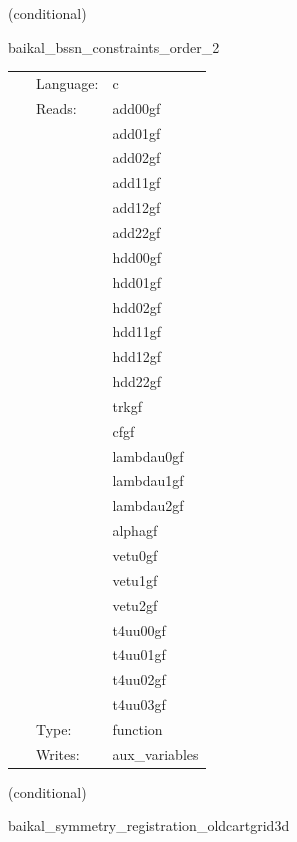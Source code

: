    (conditional) 

\hspace{5mm} baikal\_bssn\_constraints\_order\_2 

\hspace{5mm}{\it compute bssn hamiltonian, momentum, and conformal connection constraints, at finite-differencing order 2 } 


\hspace{5mm}

 \begin{tabular*}{160mm}{cll} 
~ & Language:  & c \\ 
~ & Reads:  & add00gf \\ 
~& ~ &add01gf\\ 
~& ~ &add02gf\\ 
~& ~ &add11gf\\ 
~& ~ &add12gf\\ 
~& ~ &add22gf\\ 
~& ~ &hdd00gf\\ 
~& ~ &hdd01gf\\ 
~& ~ &hdd02gf\\ 
~& ~ &hdd11gf\\ 
~& ~ &hdd12gf\\ 
~& ~ &hdd22gf\\ 
~& ~ &trkgf\\ 
~& ~ &cfgf\\ 
~& ~ &lambdau0gf\\ 
~& ~ &lambdau1gf\\ 
~& ~ &lambdau2gf\\ 
~& ~ &alphagf\\ 
~& ~ &vetu0gf\\ 
~& ~ &vetu1gf\\ 
~& ~ &vetu2gf\\ 
~& ~ &t4uu00gf\\ 
~& ~ &t4uu01gf\\ 
~& ~ &t4uu02gf\\ 
~& ~ &t4uu03gf\\ 
~ & Type:  & function \\ 
~ & Writes:  & aux\_variables \\ 
\end{tabular*} 


\vspace{5mm}

   (conditional) 

\hspace{5mm} baikal\_symmetry\_registration\_oldcartgrid3d 

